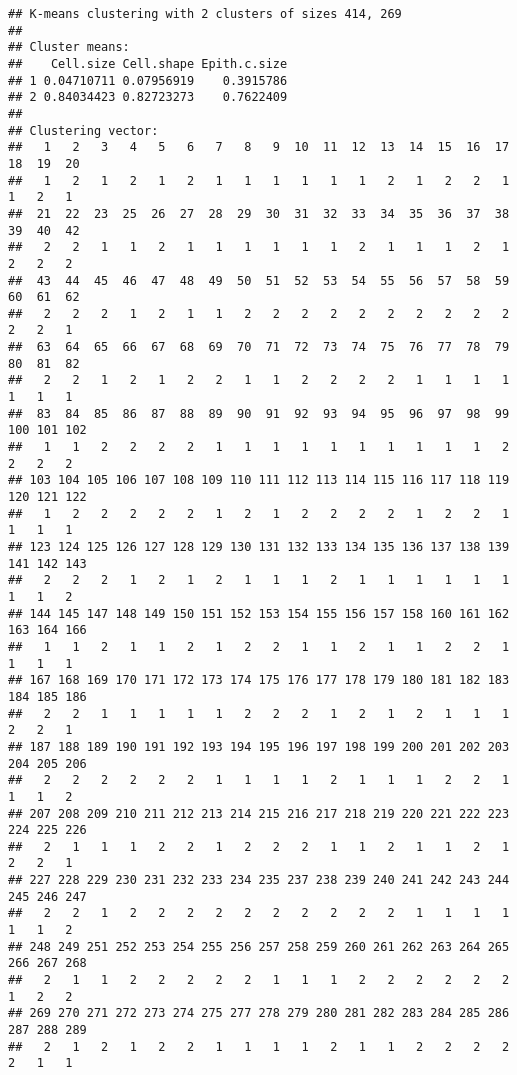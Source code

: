 \documentclass[]{article}
\begin{document}
\begin{verbatim}
## K-means clustering with 2 clusters of sizes 414, 269
## 
## Cluster means:
##    Cell.size Cell.shape Epith.c.size
## 1 0.04710711 0.07956919    0.3915786
## 2 0.84034423 0.82723273    0.7622409
## 
## Clustering vector:
##   1   2   3   4   5   6   7   8   9  10  11  12  13  14  15  16  17  18  19  20 
##   1   2   1   2   1   2   1   1   1   1   1   1   2   1   2   2   1   1   2   1 
##  21  22  23  25  26  27  28  29  30  31  32  33  34  35  36  37  38  39  40  42 
##   2   2   1   1   2   1   1   1   1   1   1   2   1   1   1   2   1   2   2   2 
##  43  44  45  46  47  48  49  50  51  52  53  54  55  56  57  58  59  60  61  62 
##   2   2   2   1   2   1   1   2   2   2   2   2   2   2   2   2   2   2   2   1 
##  63  64  65  66  67  68  69  70  71  72  73  74  75  76  77  78  79  80  81  82 
##   2   2   1   2   1   2   2   1   1   2   2   2   2   1   1   1   1   1   1   1 
##  83  84  85  86  87  88  89  90  91  92  93  94  95  96  97  98  99 100 101 102 
##   1   1   2   2   2   2   1   1   1   1   1   1   1   1   1   1   2   2   2   2 
## 103 104 105 106 107 108 109 110 111 112 113 114 115 116 117 118 119 120 121 122 
##   1   2   2   2   2   2   1   2   1   2   2   2   2   1   2   2   1   1   1   1 
## 123 124 125 126 127 128 129 130 131 132 133 134 135 136 137 138 139 141 142 143 
##   2   2   2   1   2   1   2   1   1   1   2   1   1   1   1   1   1   1   1   2 
## 144 145 147 148 149 150 151 152 153 154 155 156 157 158 160 161 162 163 164 166 
##   1   1   2   1   1   2   1   2   2   1   1   2   1   1   2   2   1   1   1   1 
## 167 168 169 170 171 172 173 174 175 176 177 178 179 180 181 182 183 184 185 186 
##   2   2   1   1   1   1   1   2   2   2   1   2   1   2   1   1   1   2   2   1 
## 187 188 189 190 191 192 193 194 195 196 197 198 199 200 201 202 203 204 205 206 
##   2   2   2   2   2   2   1   1   1   1   2   1   1   1   2   2   1   1   1   2 
## 207 208 209 210 211 212 213 214 215 216 217 218 219 220 221 222 223 224 225 226 
##   2   1   1   1   2   2   1   2   2   2   1   1   2   1   1   2   1   2   2   1 
## 227 228 229 230 231 232 233 234 235 237 238 239 240 241 242 243 244 245 246 247 
##   2   2   1   2   2   2   2   2   2   2   2   2   2   1   1   1   1   1   1   2 
## 248 249 251 252 253 254 255 256 257 258 259 260 261 262 263 264 265 266 267 268 
##   2   1   1   2   2   2   2   2   1   1   1   2   2   2   2   2   2   1   2   2 
## 269 270 271 272 273 274 275 277 278 279 280 281 282 283 284 285 286 287 288 289 
##   2   1   2   1   2   2   1   1   1   1   2   1   1   2   2   2   2   2   1   1 

\end{verbatim}
\end{document}
